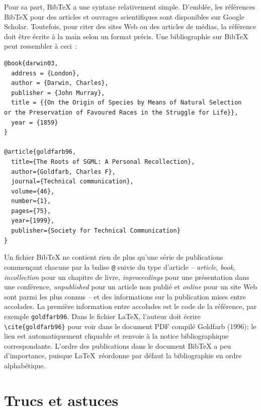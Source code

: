\documentclass[
  letterpaper,
]{scrbook}
\begin{document}
Pour sa part, BibTeX a une syntaxe relativement simple. D'emblée, les
références BibTeX pour des articles et ouvrages scientifiques sont
disponibles sur Google Scholar. Toutefois, pour citer des sites Web ou
des articles de médias, la référence doit être écrite à la main selon un
format précis. Une bibliographie sur BibTeX peut ressembler à ceci~:

\begin{verbatim}
@book{darwin03,
  address = {London},
  author = {Darwin, Charles},
  publisher = {John Murray},
  title = {{On the Origin of Species by Means of Natural Selection
or the Preservation of Favoured Races in the Struggle for Life}},
  year = {1859}
}

@article{goldfarb96,
  title={The Roots of SGML: A Personal Recollection},
  author={Goldfarb, Charles F},
  journal={Technical communication},
  volume={46},
  number={1},
  pages={75},
  year={1999},
  publisher={Society for Technical Communication}
}
\end{verbatim}

Un fichier BibTeX ne contient rien de plus qu'une série de publications
commençant chacune par la balise \texttt{@} suivie du type d'article --
\emph{article}, \emph{book}, \emph{incollection} pour un chapitre de
livre, \emph{inproceedings} pour une présentation dans une conférence,
\emph{unpublished} pour un article non publié et \emph{online} pour un
site Web sont parmi les plus connus -- et des informations sur la
publication mises entre accolades. La première information entre
accolades est le code de la référence, par exemple \texttt{goldfarb96}.
Dans le fichier \LaTeX, l'auteur doit écrire
\texttt{\textbackslash{}cite\{goldfarb96\}} pour voir dans le document
PDF compilé Goldfarb (1996); le lien est automatiquement cliquable et
renvoie à la notice bibliographique correspondante. L'ordre des
publications dans le document BibTeX a peu d'importance, puisque
\LaTeX~réordonne par défaut la bibliographie en ordre alphabétique.

\hypertarget{trucs-et-astuces-1}{%
\section{Trucs et astuces}\label{trucs-et-astuces-1}}
\end{document}
